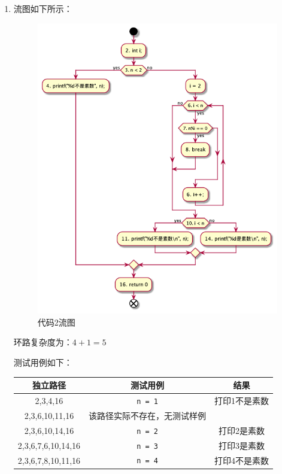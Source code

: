 \documentclass{article}
\begin{document}
\begin{enumerate}[label=\arabic*.]
\begin{enumerate}[label=代码\arabic*]
            \item 流图如下所示：\\
            \begin{figure}[H]
                \centering
                \includegraphics[scale=0.5]{fig/hw01/flow_diagram2.png}
                \caption{代码2流图}
            \end{figure}

            环路复杂度为：$4 + 1 = 5$

            测试用例如下：\\
            \begin{tabular}{|c|c|c|}
                \hline
                独立路径 & 测试用例 & 结果 \\
                \hline
                2,3,4,16 & \verb|n = 1| & 打印1不是素数 \\
                \hline
                2,3,6,10,11,16 & 该路径实际不存在，无测试样例 & ~ \\
                \hline
                2,3,6,10,14,16 & \verb|n = 2| & 打印2是素数 \\
                \hline
                2,3,6,7,6,10,14,16 & \verb|n = 3| & 打印3是素数 \\
                \hline
                2,3,6,7,8,10,11,16 & \verb|n = 4| & 打印4不是素数 \\
                \hline
            \end{tabular}
        \end{enumerate}


\end{enumerate}
\end{document}
